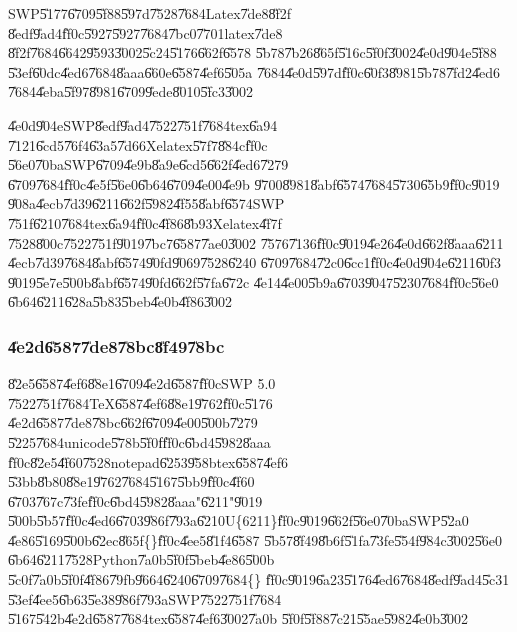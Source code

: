 SWP\U{5177}\U{6709}\U{5f88}\U{597d}\U{7528}\U{7684}Latex\U{7de8}\U{8f2f}%
\U{8edf}\U{9ad4}\U{ff0c}\U{5927}\U{5927}\U{7684}\U{7bc0}\U{7701}latex\U{7de8}%
\U{8f2f}\U{7684}\U{6642}\U{9593}\U{3002}\U{5c24}\U{5176}\U{662f}\U{6578}%
\U{5b78}\U{7b26}\U{865f}\U{516c}\U{5f0f}\U{3002}\U{4e0d}\U{904e}\U{5f88}%
\U{53ef}\U{60dc}\U{4ed6}\U{7684}\U{8aaa}\U{660e}\U{6587}\U{4ef6}\U{505a}%
\U{7684}\U{4e0d}\U{597d}\U{ff0c}\U{60f3}\U{8981}\U{5b78}\U{7fd2}\U{4ed6}%
\U{7684}\U{4eba}\U{5f97}\U{8981}\U{6709}\U{9ede}\U{8010}\U{5fc3}\U{3002}

\U{4e0d}\U{904e}SWP\U{8edf}\U{9ad4}\U{7522}\U{751f}\U{7684}tex\U{6a94}%
\U{7121}\U{6cd5}\U{76f4}\U{63a5}\U{7d66}Xelatex\U{57f7}\U{884c}\U{ff0c}%
\U{56e0}\U{70ba}SWP\U{6709}\U{4e9b}\U{8a9e}\U{6cd5}\U{662f}\U{4ed6}\U{7279}%
\U{6709}\U{7684}\U{ff0c}\U{4e5f}\U{56e0}\U{6b64}\U{6709}\U{4e00}\U{4e9b}%
\U{9700}\U{8981}\U{8abf}\U{6574}\U{7684}\U{5730}\U{65b9}\U{ff0c}\U{9019}%
\U{908a}\U{4ecb}\U{7d39}\U{6211}\U{662f}\U{5982}\U{4f55}\U{8abf}\U{6574}SWP%
\U{751f}\U{6210}\U{7684}tex\U{6a94}\U{ff0c}\U{4f86}\U{8b93}Xelatex\U{4f7f}%
\U{7528}\U{800c}\U{7522}\U{751f}\U{9019}\U{7bc7}\U{6587}\U{7ae0}\U{3002}%
\U{7576}\U{7136}\U{ff0c}\U{9019}\U{4e26}\U{4e0d}\U{662f}\U{8aaa}\U{6211}%
\U{4ecb}\U{7d39}\U{7684}\U{8abf}\U{6574}\U{90fd}\U{9069}\U{7528}\U{6240}%
\U{6709}\U{7684}\U{72c0}\U{6cc1}\U{ff0c}\U{4e0d}\U{904e}\U{6211}\U{60f3}%
\U{9019}\U{5e7e}\U{500b}\U{8abf}\U{6574}\U{90fd}\U{662f}\U{57fa}\U{672c}%
\U{4e14}\U{4e00}\U{5b9a}\U{6703}\U{9047}\U{5230}\U{7684}\U{ff0c}\U{56e0}%
\U{6b64}\U{6211}\U{628a}\U{5b83}\U{5beb}\U{4e0b}\U{4f86}\U{3002}

\subsubsection{\U{4e2d}\U{6587}\U{7de8}\U{78bc}\U{8f49}\U{78bc}}

\U{82e5}\U{6587}\U{4ef6}\U{88e1}\U{6709}\U{4e2d}\U{6587}\U{ff0c}SWP 5.0%
\U{7522}\U{751f}\U{7684}TeX\U{6587}\U{4ef6}\U{88e1}\U{9762}\U{ff0c}\U{5176}%
\U{4e2d}\U{6587}\U{7de8}\U{78bc}\U{662f}\U{6709}\U{4e00}\U{500b}\U{7279}%
\U{5225}\U{7684}unicode\U{578b}\U{5f0f}\U{ff0c}\U{6bd4}\U{5982}\U{8aaa}%
\U{ff0c}\U{82e5}\U{4f60}\U{7528}notepad\U{6253}\U{958b}tex\U{6587}\U{4ef6}%
\U{53bb}\U{8b80}\U{88e1}\U{9762}\U{7684}\U{5167}\U{5bb9}\U{ff0c}\U{4f60}%
\U{6703}\U{767c}\U{73fe}\U{ff0c}\U{6bd4}\U{5982}\U{8aaa}"\U{6211}"\U{9019}%
\U{500b}\U{5b57}\U{ff0c}\U{4ed6}\U{6703}\U{986f}\U{793a}\U{6210}\TEXTsymbol{%
\backslash}U\{6211\}\U{ff0c}\U{9019}\U{662f}\U{56e0}\U{70ba}SWP\U{52a0}%
\U{4e86}\U{5169}\U{500b}\U{62ec}\U{865f}\{\}\U{ff0c}\U{4ee5}\U{81f4}\U{6587}%
\U{5b57}\U{8f49}\U{8b6f}\U{51fa}\U{73fe}\U{554f}\U{984c}\U{3002}\U{56e0}%
\U{6b64}\U{6211}\U{7528}Python\U{7a0b}\U{5f0f}\U{5beb}\U{4e86}\U{500b}%
\U{5c0f}\U{7a0b}\U{5f0f}\U{4f86}\U{79fb}\U{9664}\U{6240}\U{6709}\U{7684}\{\}%
\U{ff0c}\U{9019}\U{6a23}\U{5176}\U{4ed6}\U{7684}\U{8edf}\U{9ad4}\U{5c31}%
\U{53ef}\U{4ee5}\U{6b63}\U{5e38}\U{986f}\U{793a}SWP\U{7522}\U{751f}\U{7684}%
\U{5167}\U{542b}\U{4e2d}\U{6587}\U{7684}tex\U{6587}\U{4ef6}\U{3002}\U{7a0b}%
\U{5f0f}\U{5f88}\U{7c21}\U{55ae}\U{5982}\U{4e0b}\U{3002}

